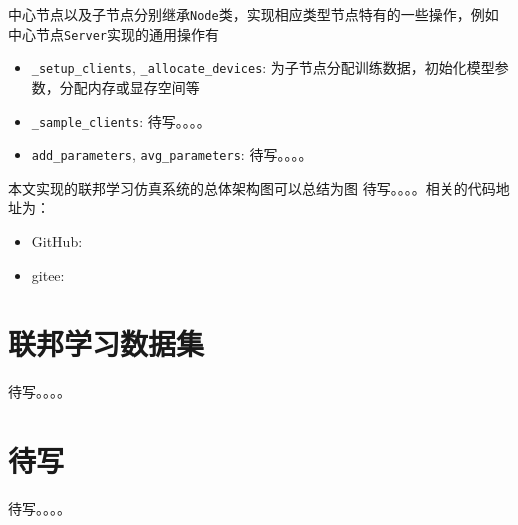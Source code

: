 中心节点以及子节点分别继承\texttt{Node}类，实现相应类型节点特有的一些操作，例如中心节点\texttt{Server}实现的通用操作有
\begin{itemize}
    \item \texttt{\_setup\_clients}, \texttt{\_allocate\_devices}: 为子节点分配训练数据，初始化模型参数，分配内存或显存空间等
    \item \texttt{\_sample\_clients}: 待写。。。。
    \item \texttt{add\_parameters}, \texttt{avg\_parameters}: 待写。。。。
\end{itemize}

本文实现的联邦学习仿真系统的总体架构图可以总结为图 待写。。。。相关的代码地址为：
\begin{itemize}
    \item GitHub: \urlgithub
    \item gitee: \urlgitee
\end{itemize}

\section{联邦学习数据集}
\label{sec:chap4-datasets}


待写。。。。

\section{待写}


待写。。。。
